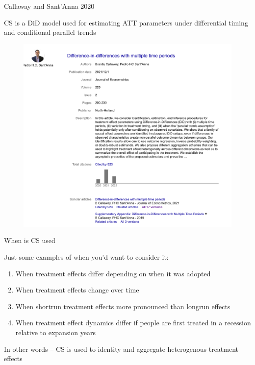 \documentclass{beamer}
\begin{document}
\begin{frame}{Callaway and Sant'Anna 2020}

CS is a DiD model used for estimating ATT parameters under differential timing and conditional parallel trends


\begin{figure}
\includegraphics[scale=0.25]{./lecture_includes/pedro_cites}
\end{figure}

\end{frame}


\begin{frame}{When is CS used}

Just some examples of when you'd want to consider it:
\begin{enumerate}
\item When treatment effects differ depending on when it was adopted
\item When treatment effects change over time
\item When shortrun treatment effects more pronounced than longrun effects
\item When treatment effect dynamics differ if people are first treated in a recession relative to expansion years
\end{enumerate}

\bigskip

In other words -- CS is used to identity and aggregate heterogenous treatment effects

\end{frame}
\end{document}
